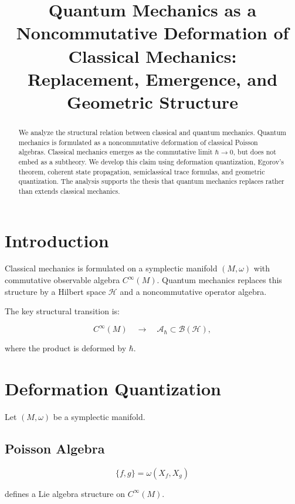 \documentclass[11pt,a4paper]{article}
\title{\textbf{Quantum Mechanics as a Noncommutative Deformation of Classical Mechanics:\\
Replacement, Emergence, and Geometric Structure}}
\author{}
\date{}
\begin{document}
\maketitle

\begin{abstract}
We analyze the structural relation between classical and quantum mechanics. 
Quantum mechanics is formulated as a noncommutative deformation of classical 
Poisson algebras. Classical mechanics emerges as the commutative limit 
$\hbar \to 0$, but does not embed as a subtheory. We develop this claim 
using deformation quantization, Egorov’s theorem, coherent state 
propagation, semiclassical trace formulas, and geometric quantization. 
The analysis supports the thesis that quantum mechanics replaces rather 
than extends classical mechanics.
\end{abstract}

\tableofcontents

\section{Introduction}

Classical mechanics is formulated on a symplectic manifold $(M,\omega)$ 
with commutative observable algebra $C^\infty(M)$. 
Quantum mechanics replaces this structure by a Hilbert space 
$\mathcal H$ and a noncommutative operator algebra.

The key structural transition is:

\[
C^\infty(M)
\quad \longrightarrow \quad
\mathcal A_\hbar \subset \mathcal B(\mathcal H),
\]

where the product is deformed by $\hbar$.

\section{Deformation Quantization}

Let $(M,\omega)$ be a symplectic manifold.

\subsection{Poisson Algebra}

\[
\{f,g\} = \omega(X_f,X_g)
\]

defines a Lie algebra structure on $C^\infty(M)$.
\end{document}
